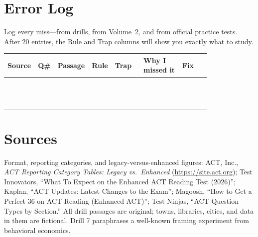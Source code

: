 \documentclass[11pt]{article}
\begin{document}
\section{Error Log}
Log every miss---from drills, from Volume~2, and from official practice tests. After 20 entries, the Rule and Trap columns will show you exactly what to study.

\begin{center}
\small
\renewcommand{\arraystretch}{1.9}
\begin{tabular}{@{}|p{0.09\linewidth}|p{0.07\linewidth}|p{0.12\linewidth}|p{0.06\linewidth}|p{0.14\linewidth}|p{0.19\linewidth}|p{0.14\linewidth}|@{}}
\hline
\textbf{Source} & \textbf{Q\#} & \textbf{Passage} & \textbf{Rule} & \textbf{Trap} & \textbf{Why I missed it} & \textbf{Fix}\\
\hline
 & & & & & & \\ \hline
 & & & & & & \\ \hline
 & & & & & & \\ \hline
 & & & & & & \\ \hline
 & & & & & & \\ \hline
 & & & & & & \\ \hline
 & & & & & & \\ \hline
 & & & & & & \\ \hline
 & & & & & & \\ \hline
 & & & & & & \\ \hline
 & & & & & & \\ \hline
 & & & & & & \\ \hline
\end{tabular}
\end{center}

\section*{Sources}
{\small
Format, reporting categories, and legacy-versus-enhanced figures: ACT, Inc., \emph{ACT Reporting Category Tables: Legacy vs.\ Enhanced} (\url{https://site.act.org}); Test Innovators, ``What To Expect on the Enhanced ACT Reading Test (2026)''; Kaplan, ``ACT Updates: Latest Changes to the Exam''; Magoosh, ``How to Get a Perfect 36 on ACT Reading (Enhanced ACT)''; Test Ninjas, ``ACT Question Types by Section.'' All drill passages are original; towns, libraries, cities, and data in them are fictional. Drill 7 paraphrases a well-known framing experiment from behavioral economics.\par}

\end{document}
